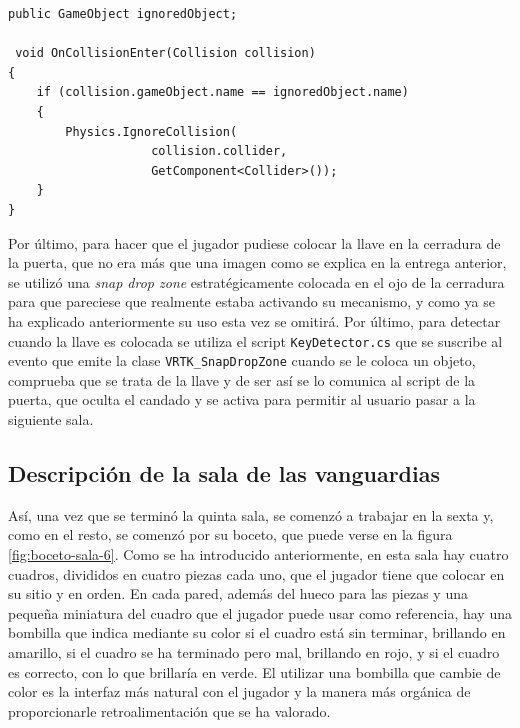 \begin{lstlisting}[caption=Fragmento del script para ignorar colisiones, label=lst:collision-ignorer]
public GameObject ignoredObject;

 void OnCollisionEnter(Collision collision)
{
    if (collision.gameObject.name == ignoredObject.name)
    {
        Physics.IgnoreCollision(
                    collision.collider, 
                    GetComponent<Collider>());
    }
}
\end{lstlisting}

Por último, para hacer que el jugador pudiese colocar la llave en la cerradura de la puerta, que no era más que una imagen como se explica en la entrega anterior, se utilizó una \textit{snap drop zone} estratégicamente colocada en el ojo de la cerradura para que pareciese que realmente estaba activando su mecanismo, y como ya se ha explicado anteriormente su uso esta vez se omitirá. Por último, para detectar cuando la llave es colocada se utiliza el script \texttt{KeyDetector.cs} que se suscribe al evento que emite la clase \texttt{VRTK\_SnapDropZone} cuando se le coloca un objeto, comprueba que se trata de la llave y de ser así se lo comunica al script de la puerta, que oculta el candado y se activa para permitir al usuario pasar a la siguiente sala.

\subsection{Descripción de la sala de las vanguardias}

Así, una vez que se terminó la quinta sala, se comenzó a trabajar en la sexta y, como en el resto, se comenzó por su boceto, que puede verse en la figura \ref{fig:boceto-sala-6}. Como se ha introducido anteriormente, en esta sala hay cuatro cuadros, divididos en cuatro piezas cada uno, que el jugador tiene que colocar en su sitio y en orden. En cada pared, además del hueco para las piezas y una pequeña miniatura del cuadro que el jugador puede usar como referencia, hay una bombilla que indica mediante su color si el cuadro está sin terminar, brillando en amarillo, si el cuadro se ha terminado pero mal, brillando en rojo, y si el cuadro es correcto, con lo que brillaría en verde. El utilizar una bombilla que cambie de color es la interfaz más natural con el jugador y la manera más orgánica de proporcionarle retroalimentación que se ha valorado.

